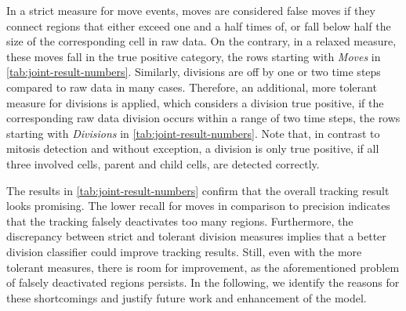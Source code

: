 In a strict measure for move events, moves are considered false moves if they connect regions that
either exceed one and a half times of, or fall below half the size of the corresponding cell in raw
data. On the contrary, in a relaxed measure, these moves fall in the true positive category, \cf the
rows starting with \emph{Moves} in \cref{tab:joint-result-numbers}. Similarly, divisions are off by
one or two time steps compared to raw data in many cases. Therefore, an additional, more tolerant
measure for divisions is applied, which considers a division true positive, if the
corresponding raw data division occurs within a range of two time steps, \cf the rows starting with
\emph{Divisions} in \cref{tab:joint-result-numbers}. Note that, in contrast to mitosis detection and
without exception, a division is only true positive, if all three involved cells, \ie parent and
child cells, are detected correctly.



The results in \cref{tab:joint-result-numbers} confirm that the overall tracking result looks
promising. The lower recall for moves in comparison to precision indicates that the tracking falsely
deactivates too many regions. Furthermore, the discrepancy between strict and tolerant division
measures implies that a better division classifier could improve tracking results. Still, even with
the more tolerant measures, there is room for improvement, as the aforementioned problem of falsely
deactivated regions persists. In the following, we identify the reasons for these shortcomings and
justify future work and enhancement of the model.

